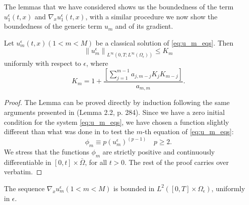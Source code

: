 The lemmas that we have considered shows us the boundedness of the term $u_1^{\epsilon}(t,x)$ and $\nabla_{x} u_{1}^{\epsilon}(t, x)$, with a similar procedure we now show the boundedness of the generic term $u_m$ and of its gradient.
\begin{lemma} Let $u_{m}^{\epsilon}(t, x)(1<m<M)$ be a classical solution of \eqref{eq:u_m_eqs}. Then
\begin{equation}
  \left\|u_{m}^{\epsilon}\right\|_{L^{\infty}\left(0, T ; L^{\infty}\left(\Omega_{\epsilon}\right)\right)} \leq K_{m}
\label{eq 62}\end{equation}
uniformly with respect to $\epsilon$, where
\begin{equation}
  K_{m}=1+\frac{\left[\sum_{j=1}^{m-1} a_{j, m-j} K_{j} K_{m-j}\right]}{a_{m, m}}.
\label{eq 63}\end{equation}
\label{lemma 5.5}\end{lemma}
\begin{proof}
The Lemma can be proved directly by induction following the same arguments presented in \cite{Wrzosek_1997} (Lemma 2.2, p. 284). Since we have a zero initial condition for the system \eqref{eq:u_m_eqs}, we have chosen a function slightly different than what was done in \cite{Wrzosek_1997} to test the $m$-th equation of \eqref{eq:u_m_eqs}:
$$
\phi_{m} \equiv p\left(u_{m}^{\epsilon}\right)^{(p-1)} \quad p \geq 2 .
$$
We stress that the functions $\phi_{m}$ are strictly positive and continuously differentiable in $[0, t] \times \bar{\Omega}$, for all $t>0$. The rest of the proof carries over verbatim.
\end{proof} 
\begin{lemma}
The sequence $\nabla_{x} u_{m}^{\epsilon}(1<m<M)$ is bounded in $L^{2}\left([0, T] \times \Omega_{\epsilon}\right)$, uniformly in $\epsilon$.
\label{lemma 5.6}\end{lemma}
